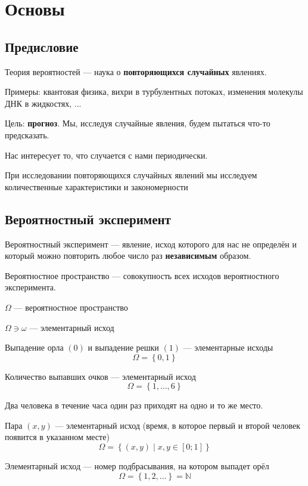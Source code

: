 \chapter{Основы}

\section{Предисловие}
Теория вероятностей --- наука о \textbf{повторяющихся случайных} явлениях.

Примеры: квантовая физика, вихри в турбулентных потоках,
изменения молекулы ДНК в жидкостях, ...

Цель: \textbf{прогноз}. Мы, исследуя случайные явления,
будем пытаться что-то предсказать.

Нас интересует то, что случается с нами периодически.

При исследовании повторяющихся случайных явлений мы исследуем
количественные характеристики и закономерности

\section{Вероятностный эксперимент}
\begin{definition}
    Вероятностный эксперимент --- явление,
    исход которого для нас не определён
    и который можно повторить любое число раз \textbf{независимым} образом.
\end{definition}
\begin{definition}
    Вероятностное пространство --- совокупность всех исходов
    вероятностного эксперимента.
\end{definition}
$\Omega$ --- вероятностное пространство

$\Omega \ni \omega$ --- элементарный исход

\begin{example}
Выпадение орла $\left( 0 \right)$
и выпадение решки $\left( 1 \right)$ --- элементарные исходы
$$\Omega = \left\{ 0, 1 \right\}$$
\end{example}
\begin{example}
Количество выпавших очков --- элементарный исход
$$\Omega = \left\{ 1, \dots, 6 \right\}$$
\end{example}
\begin{example}
Два человека в течение часа один раз приходят на одно и то же место.

Пара $\left( x,y \right)$ --- элементарный исход
(время, в которое первый и второй человек появится в указанном месте)
$$\Omega = \left\{ \left(x,y\right) \mid x,y \in [0;1] \right\}$$
\end{example}
\begin{example}
    Элементарный исход --- номер подбрасывания, на котором выпадет орёл
$$\Omega = \left\{ 1,2, \dots \right\} =  \mathbb{N}$$
\end{example}
